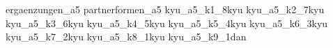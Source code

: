 
\usepackage{import}
\usepackage[backend=biber,style=alphabetic]{biblatex}%

\AtBeginBibliography{\scriptsize}

	\nocite{*}
	{ergaenzungen_a5}\clearpage\pagebreak
	{partnerformen_a5}\clearpage\pagebreak
	{kyu_a5_k1_8kyu}\clearpage\pagebreak
	{kyu_a5_k2_7kyu}\clearpage\pagebreak
	{kyu_a5_k3_6kyu}\clearpage\pagebreak
	{kyu_a5_k4_5kyu}\clearpage\pagebreak
	{kyu_a5_k5_4kyu}\clearpage\pagebreak
	{kyu_a5_k6_3kyu}\clearpage\pagebreak
	{kyu_a5_k7_2kyu}\clearpage\pagebreak
	{kyu_a5_k8_1kyu}\clearpage\pagebreak
	{kyu_a5_k9_1dan}\clearpage\pagebreak
	\ClearShipoutPictureFG
	\printbibliography[title={\small Verwendete Literatur und Internetquellen}]

